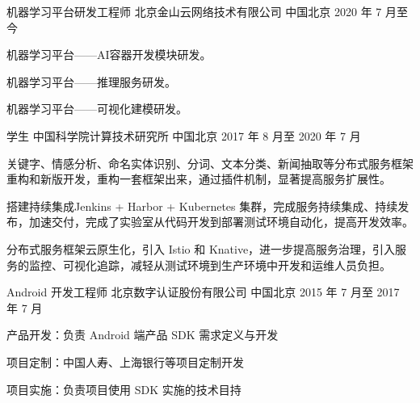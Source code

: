 

\begin{cventries}

\cventry
{机器学习平台研发工程师} %
{北京金山云网络技术有限公司} %
{中国北京} %
{2020 年 7 月至今} %
{
  \begin{cvitems} %
    \item 机器学习平台——AI容器开发模块研发。
    \item 机器学习平台——推理服务研发。
    \item 机器学习平台——可视化建模研发。
  \end{cvitems}
}

  \cventry
    {学生} %
    {中国科学院计算技术研究所} %
    {中国北京} %
    {2017 年 8 月至 2020 年 7 月} %
    {
      \begin{cvitems} %
        \item 关键字、情感分析、命名实体识别、分词、文本分类、新闻抽取等分布式服务框架重构和新版开发，重构一套框架出来，通过插件机制，显著提高服务扩展性。
        \item 搭建持续集成Jenkins + Harbor + Kubernetes 集群，完成服务持续集成、持续发布，加速交付，完成了实验室从代码开发到部署测试环境自动化，提高开发效率。
        \item 分布式服务框架云原生化，引入 Istio 和 Knative，进一步提高服务治理，引入服务的监控、可视化追踪，减轻从测试环境到生产环境中开发和运维人员负担。
      \end{cvitems}
    }

  \cventry
    {Android 开发工程师} %
    {北京数字认证股份有限公司} %
    {中国北京} %
    {2015 年 7 月至 2017 年 7 月} %
    {
      \begin{cvitems} %
        \item 产品开发：负责 Android 端产品 SDK 需求定义与开发
        \item 项目定制：中国人寿、上海银行等项目定制开发
        \item 项目实施：负责项目使用 SDK 实施的技术目持
      \end{cvitems}
    }

\end{cventries}
